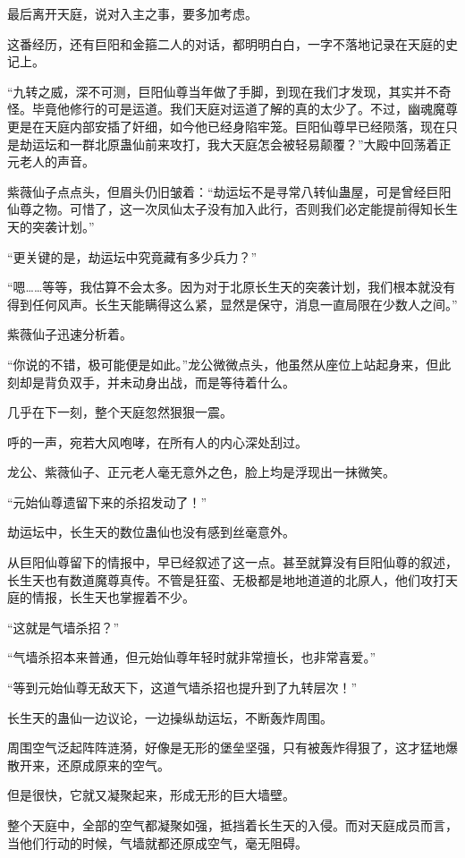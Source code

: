 \begin{this_body}
最后离开天庭，说对入主之事，要多加考虑。

这番经历，还有巨阳和金箍二人的对话，都明明白白，一字不落地记录在天庭的史记上。

“九转之威，深不可测，巨阳仙尊当年做了手脚，到现在我们才发现，其实并不奇怪。毕竟他修行的可是运道。我们天庭对运道了解的真的太少了。不过，幽魂魔尊更是在天庭内部安插了奸细，如今他已经身陷牢笼。巨阳仙尊早已经陨落，现在只是劫运坛和一群北原蛊仙前来攻打，我大天庭怎会被轻易颠覆？”大殿中回荡着正元老人的声音。

紫薇仙子点点头，但眉头仍旧皱着：“劫运坛不是寻常八转仙蛊屋，可是曾经巨阳仙尊之物。可惜了，这一次凤仙太子没有加入此行，否则我们必定能提前得知长生天的突袭计划。”

“更关键的是，劫运坛中究竟藏有多少兵力？”

“嗯……等等，我估算不会太多。因为对于北原长生天的突袭计划，我们根本就没有得到任何风声。长生天能瞒得这么紧，显然是保守，消息一直局限在少数人之间。”

紫薇仙子迅速分析着。

“你说的不错，极可能便是如此。”龙公微微点头，他虽然从座位上站起身来，但此刻却是背负双手，并未动身出战，而是等待着什么。

几乎在下一刻，整个天庭忽然狠狠一震。

呼的一声，宛若大风咆哮，在所有人的内心深处刮过。

龙公、紫薇仙子、正元老人毫无意外之色，脸上均是浮现出一抹微笑。

“元始仙尊遗留下来的杀招发动了！”

劫运坛中，长生天的数位蛊仙也没有感到丝毫意外。

从巨阳仙尊留下的情报中，早已经叙述了这一点。甚至就算没有巨阳仙尊的叙述，长生天也有数道魔尊真传。不管是狂蛮、无极都是地地道道的北原人，他们攻打天庭的情报，长生天也掌握着不少。

“这就是气墙杀招？”

“气墙杀招本来普通，但元始仙尊年轻时就非常擅长，也非常喜爱。”

“等到元始仙尊无敌天下，这道气墙杀招也提升到了九转层次！”

长生天的蛊仙一边议论，一边操纵劫运坛，不断轰炸周围。

周围空气泛起阵阵涟漪，好像是无形的堡垒坚强，只有被轰炸得狠了，这才猛地爆散开来，还原成原来的空气。

但是很快，它就又凝聚起来，形成无形的巨大墙壁。

整个天庭中，全部的空气都凝聚如强，抵挡着长生天的入侵。而对天庭成员而言，当他们行动的时候，气墙就都还原成空气，毫无阻碍。


\end{this_body}

